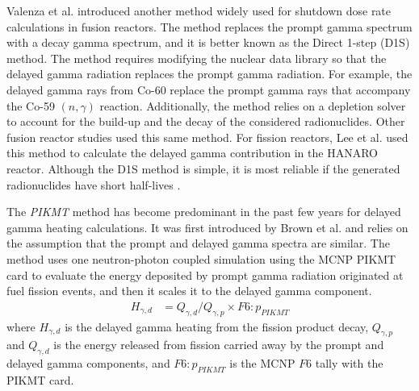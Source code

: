 Valenza et al. \cite{valenza_proposal_2001} introduced another method widely used for shutdown dose rate calculations in fusion reactors.
The method replaces the prompt gamma spectrum with a decay gamma spectrum, and it is better known as the Direct 1-step (D1S) method.
The method requires modifying the nuclear data library so that the delayed gamma radiation replaces the prompt gamma radiation.
For example, the delayed gamma rays from Co-60 replace the prompt gamma rays that accompany the Co-59 $(n, \gamma)$ reaction.
Additionally, the method relies on a depletion solver to account for the build-up and the decay of the considered radionuclides.
Other fusion reactor studies \cite{petrizzi_improvement_2001, palermo_shutdown_2017} used this same method.
For fission reactors, Lee et al. \cite{lee_analysis_2008} used this method to calculate the delayed gamma contribution in the HANARO reactor.
Although the D1S method is simple, it is most reliable if the generated radionuclides have short half-lives \cite{noh_estimation_2018}.

The \textit{PIKMT} method has become predominant in the past few years for delayed gamma heating calculations.
It was first introduced by Brown et al. \cite{brown_monte_2008} and relies on the assumption that the prompt and delayed gamma spectra are similar.
The method uses one neutron-photon coupled simulation using the MCNP PIKMT card to evaluate the energy deposited by prompt gamma radiation originated at fuel fission events, and then it scales it to the delayed gamma component.
\begin{align}
H_{\gamma, d} &= Q_{\gamma, d} / Q_{\gamma, p} \times F6\!:\!p_{PIKMT}
\end{align}
where $H_{\gamma, d}$ is the delayed gamma heating from the fission product decay, $Q_{\gamma, p}$ and $Q_{\gamma, d}$ is the energy released from fission carried away by the prompt and delayed gamma components, and $F6\!:\!p_{PIKMT}$ is the MCNP $F6$ tally with the PIKMT card.

